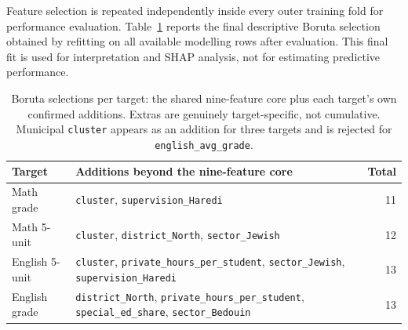 Feature selection is repeated independently inside every outer training fold for
performance evaluation. Table~\ref{tab:boruta} reports the final descriptive
Boruta selection obtained by refitting on all available modelling rows after
evaluation. This final fit is used for interpretation and SHAP analysis, not for
estimating predictive performance.

\begin{table}[H]
\centering
\footnotesize
\renewcommand{\arraystretch}{1.3}
\caption{Boruta selections per target: the shared nine-feature core plus each
target's own confirmed additions. Extras are genuinely target-specific, not
cumulative. Municipal \texttt{cluster} appears as an addition for three targets
and is rejected for \texttt{english\_avg\_grade}.}
\label{tab:boruta}
\begin{tabular}{@{}>{\raggedright\arraybackslash}p{3.4cm}>{\raggedright\arraybackslash}p{8.6cm}r@{}}
\toprule
\textbf{Target} & \textbf{Additions beyond the nine-feature core} & \textbf{Total} \\
\midrule
Math grade      & \texttt{cluster}, \texttt{supervision\_Haredi} & 11 \\
Math 5-unit     & \texttt{cluster}, \texttt{district\_North}, \texttt{sector\_Jewish} & 12 \\
English 5-unit  & \texttt{cluster}, \texttt{private\_\allowbreak hours\_\allowbreak per\_student}, \texttt{sector\_Jewish}, \texttt{supervision\_Haredi} & 13 \\
English grade   & \texttt{district\_North}, \texttt{private\_\allowbreak hours\_\allowbreak per\_student}, \texttt{special\_\allowbreak ed\_share}, \texttt{sector\_Bedouin} & 13 \\
\bottomrule
\end{tabular}
\end{table}
